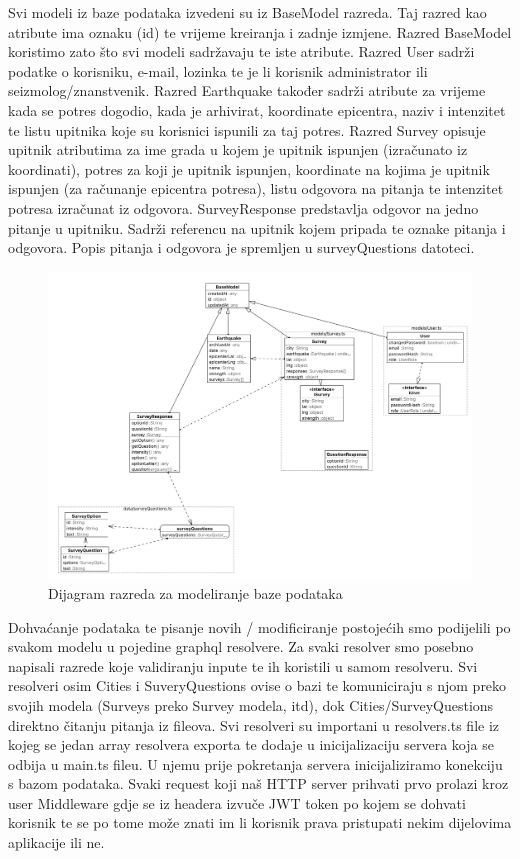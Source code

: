 			Svi modeli iz baze podataka izvedeni su iz BaseModel razreda. Taj razred kao atribute ima oznaku (id) te vrijeme kreiranja i zadnje izmjene. 
			Razred BaseModel koristimo zato što svi modeli sadržavaju te iste atribute. 
			Razred User sadrži podatke o korisniku, e-mail, lozinka te je li korisnik administrator ili seizmolog/znanstvenik.
			Razred Earthquake također sadrži atribute za vrijeme kada se potres dogodio, kada je arhivirat, koordinate epicentra, naziv i intenzitet te listu upitnika koje su korisnici ispunili za taj potres.
			Razred Survey opisuje upitnik atributima za ime grada u kojem je upitnik ispunjen (izračunato iz koordinati), potres za koji je upitnik ispunjen, koordinate na kojima je upitnik ispunjen (za računanje epicentra potresa), listu odgovora na pitanja te intenzitet potresa izračunat iz odgovora.
			SurveyResponse predstavlja odgovor na jedno pitanje u upitniku. Sadrži referencu na upitnik kojem pripada te oznake pitanja i odgovora. 
			Popis pitanja i odgovora je spremljen u surveyQuestions datoteci.
			\begin{figure}[H]
				\includegraphics[width=\textwidth]{slike/classdiagram_only_db.png} 
				\caption{Dijagram razreda za modeliranje baze podataka}
				\label{fig:uml_db} 
			\end{figure}

			Dohvaćanje podataka te pisanje novih / modificiranje postojećih smo podijelili po svakom modelu u pojedine graphql resolvere. 
			Za svaki resolver smo posebno napisali razrede koje validiranju inpute te ih koristili u samom resolveru. 
			Svi resolveri osim Cities i SuveryQuestions ovise o bazi te komuniciraju s njom preko svojih modela (Surveys preko Survey modela, itd), 
			dok Cities/SurveyQuestions direktno čitanju pitanja iz fileova. Svi resolveri su importani u resolvers.ts file iz kojeg se jedan array 
			resolvera exporta te dodaje u inicijalizaciju servera koja se odbija u main.ts fileu. U njemu prije pokretanja servera inicijaliziramo 
			konekciju s bazom podataka. Svaki request koji naš HTTP server prihvati prvo prolazi kroz user Middleware gdje se iz headera izvuče JWT 
			token po kojem se dohvati korisnik te se po tome može znati im li korisnik prava pristupati nekim dijelovima aplikacije ili ne.

